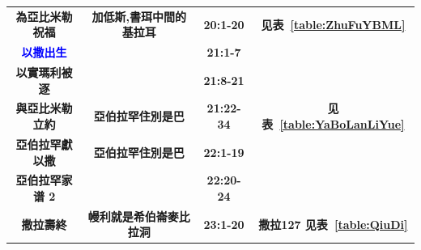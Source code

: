 \begin{table}[!hbp]
\begin{threeparttable}
\begin{tabular}{c c c c}
\multicolumn{1}{L{\dimexpr0.25\linewidth-1\tabcolsep\relax}}{\bfseries 為亞比米勒祝福} 
& \multicolumn{1}{L{\dimexpr0.2\linewidth-1\tabcolsep\relax}}{\bfseries 加低斯,書珥中間的基拉耳}  
& \multicolumn{1}{L{\dimexpr0.1\linewidth-1\tabcolsep\relax}}{\bfseries 20:1-20}
& \multicolumn{1}{L{\dimexpr0.2\linewidth-1\tabcolsep\relax}}{\bfseries 见表~\ref{table:ZhuFuYBML}}\\

\multicolumn{1}{L{\dimexpr0.25\linewidth-1\tabcolsep\relax}}{\bfseries \textcolor{blue}{以撒出生}} 
& \multicolumn{1}{L{\dimexpr0.2\linewidth-1\tabcolsep\relax}}{\bfseries }  
& \multicolumn{1}{L{\dimexpr0.1\linewidth-1\tabcolsep\relax}}{\bfseries 21:1-7}
& \multicolumn{1}{L{\dimexpr0.2\linewidth-1\tabcolsep\relax}}{\bfseries }\\

\multicolumn{1}{L{\dimexpr0.25\linewidth-1\tabcolsep\relax}}{\bfseries 以實瑪利被逐}  
& \multicolumn{1}{L{\dimexpr0.2\linewidth-1\tabcolsep\relax}}{\bfseries } 
& \multicolumn{1}{L{\dimexpr0.1\linewidth-1\tabcolsep\relax}}{\bfseries 21:8-21}
& \multicolumn{1}{L{\dimexpr0.2\linewidth-1\tabcolsep\relax}}{\bfseries }\\\hline

\multicolumn{1}{L{\dimexpr0.25\linewidth-1\tabcolsep\relax}}{\bfseries 與亞比米勒立約} 
& \multicolumn{1}{L{\dimexpr0.2\linewidth-1\tabcolsep\relax}}{\bfseries 亞伯拉罕住別是巴}  
& \multicolumn{1}{L{\dimexpr0.1\linewidth-1\tabcolsep\relax}}{\bfseries 21:22-34}
& \multicolumn{1}{L{\dimexpr0.2\linewidth-1\tabcolsep\relax}}{\bfseries 见表~\ref{table:YaBoLanLiYue}}\\ 

\multicolumn{1}{L{\dimexpr0.25\linewidth-1\tabcolsep\relax}}{\bfseries 亞伯拉罕獻以撒}  
& \multicolumn{1}{L{\dimexpr0.2\linewidth-1\tabcolsep\relax}}{\bfseries 亞伯拉罕住別是巴} 
& \multicolumn{1}{L{\dimexpr0.1\linewidth-1\tabcolsep\relax}}{\bfseries 22:1-19}
& \multicolumn{1}{L{\dimexpr0.2\linewidth-1\tabcolsep\relax}}{\bfseries }\\

\multicolumn{1}{L{\dimexpr0.25\linewidth-1\tabcolsep\relax}}{\bfseries 亞伯拉罕家谱 2} 
& \multicolumn{1}{L{\dimexpr0.2\linewidth-1\tabcolsep\relax}}{\bfseries }  
& \multicolumn{1}{L{\dimexpr0.1\linewidth-1\tabcolsep\relax}}{\bfseries 22:20-24}
& \multicolumn{1}{L{\dimexpr0.2\linewidth-1\tabcolsep\relax}}{\bfseries }\\

\multicolumn{1}{L{\dimexpr0.25\linewidth-1\tabcolsep\relax}}{\bfseries 撒拉壽終 }  
& \multicolumn{1}{L{\dimexpr0.2\linewidth-1\tabcolsep\relax}}{\bfseries 幔利就是希伯崙麥比拉洞} 
& \multicolumn{1}{L{\dimexpr0.1\linewidth-1\tabcolsep\relax}}{\bfseries 23:1-20}
& \multicolumn{1}{L{\dimexpr0.22\linewidth-1\tabcolsep\relax}}{\bfseries 撒拉127 见表~\ref{table:QiuDi}}\\


\end{tabular}
\end{threeparttable}
\end{table}
